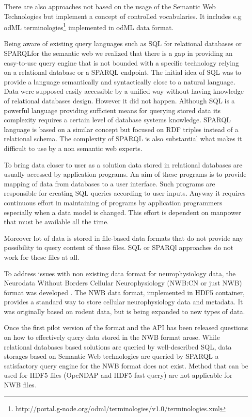 \documentclass[utf8]{frontiersSCNS} %
\begin{document}
There are also approaches not based on the usage of the Semantic Web Technologies but implement a concept of controlled vocabularies. It includes e.g odML terminologies\footnote{http://portal.g-node.org/odml/terminologies/v1.0/terminologies.xml} implemented in odML\citep{10.3389/fninf.2011.00016} data format.

Being aware of existing query languages such as SQL for relational databases or SPARQL\citep{prudhommeaux2008sparql}for the semantic web we realized that there is a gap in providing an easy-to-use query engine that is not bounded with a specific technology relying on a relational database or a SPARQL endpoint. The initial idea of SQL was to provide a language semantically and syntactically close to a natural language. Data were supposed easily accessible by a unified way without having knowledge of relational databases design. However it did not happen. Although SQL is a powerful language providing sufficient means for querying stored data its complexity requires a certain level of database systems knowledge. SPARQL language is based on a similar concept but focused on RDF triples instead of a relational schema. The complexity of SPARQL is also substantial what makes it difficult to use by a non semantic web experts.

To bring data closer to user as a solution data stored in relational databases are usually accessed by application programs. An aim of these programs is to provide mapping of data from databases to a user interface. Such programs are responsible for creating SQL queries according to user inputs. Anyway it requires continuous effort in maintaining of programs by application programmers especially when a data model is changed. This effort is dependent on manpower that must be available all the time.

Moreover lot of data is stored in file-based data formats that do not provide any possibility to query content of these files. SQL or SPARQl approaches do not work for these files at all. 

To address issues with non existing data format for neurophysiology data, the Neurodata Without Borders Cellular Neurophysiology (NWB:CN or just NWB) format was developed \citep{teeters-neuron}. The NWB data format, implemented in HDF5 container, provides a standard way to store cellular neurophysiology data and metadata. It was originally based on rodent data, but is being expanded to new types of data. 

Once the first pilot version of the format and the API has been released questions on how to effectively query data stored in the NWB format arose. While relational databases based solutions are queried by well-described SQL, data storages based on Semantic Web technologies are queried by SPARQL a satisfactory query engine for the NWB format does not exist. Method that can be used for HDF5 files (OpeNDAP and HDF5 fast query) are not applicable for NWB files.
\end{document}
